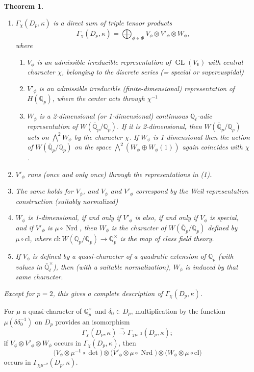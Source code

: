 \documentclass[11pt,a4paper]{article}
\theoremstyle{plain}
\newtheorem{theorem}{Theorem}[section]
\theoremstyle{definition}
\theoremstyle{remark}
\DeclareMathOperator{\GL}{GL}
\DeclareMathOperator{\Nrd}{Nrd}
\newcommand{\Qpbar}{\overline{\mathbb{Q}}_{p}}
\newcommand{\Qp}{\mathbb{Q}_{p}}
\newcommand{\Qlbar}{\overline{\mathbb{Q}}_{\ell}}
\begin{document}
\begin{theorem}
\begin{enumerate}[label=(\roman*)]
\item $\Gamma_{\chi}(D_{p}, \kappa)$ is a direct sum of triple tensor products
\[
\Gamma_{\chi}(D_{p}, \kappa) = \bigoplus_{\phi \in \Phi} V_{\phi} \otimes V'_{\phi} \otimes W_{\phi},
\]
where
\begin{enumerate}[label=(\alph*)]
\item $V_{\phi}$ is an admissible irreducible representation of $\GL(V_{0})$ with central character $\chi$, belonging to the discrete series (= special or supercuspidal)
\item $V'_{\phi}$ is an admissible irreducible (finite-dimensional) representation of $H(\Qp)$, where the center acts through $\chi^{-1}$
\item $W_{\phi}$ is a 2-dimensional (or 1-dimensional) continuous $\Qlbar$-adic representation of $W(\Qpbar/\Qp)$. If it is 2-dimensional, then $W(\Qpbar/\Qp)$ acts on $\bigwedge^{2} W_{\phi}$ by the character $\chi$. If $W_{\phi}$ is 1-dimensional then the action of $W(\Qpbar/\Qp)$ on the space $\bigwedge^{2}(W_{\phi} \oplus W_{\phi}(1))$ again coincides with $\chi$.
\end{enumerate}
\item $V'_{\phi}$ runs (once and only once) through the representations in (1).
\item The same holds for $V_{\phi}$, and $V_{\phi}$ and $V'_{\phi}$ correspond by the Weil representation construction (suitably normalized)
\item $W_{\phi}$ is 1-dimensional, if and only if $V'_{\phi}$ is also, if and only if $V_{\phi}$ is special, and if $V'_{\phi}$ is $\mu \circ \Nrd$, then $W_{\phi}$ is the character of $W(\Qpbar/\Qp)$ defined by $\mu \circ \mathrm{cl}$, where $\mathrm{cl} : W(\Qpbar/\Qp) \to \Qp^{\times}$ is the map of class field theory.
\item If $V_{\phi}$ is defined by a quasi-character of a quadratic extension of $\Qp$ (with values in $\Qlbar^{\times}$), then (with a suitable normalization), $W_{\phi}$ is induced by that same character.
\end{enumerate}
Except for $p = 2$, this gives a complete description of $\Gamma_{\chi}(D_{p}, \kappa)$.
\end{theorem}

For $\mu$ a quasi-character of $\Qp^{\times}$ and $\delta_{0} \in D_{p}$, multiplication by the function $\mu(\delta\delta_{0}^{-1})$ on $D_{p}$ provides an isomorphism
\[
\Gamma_{\chi}(D_{p}, \kappa) \xrightarrow{\sim} \Gamma_{\chi\mu^{-2}}(D_{p}, \kappa);
\]
if $V_{\phi} \otimes V'_{\phi} \otimes W_{\phi}$ occurs in $\Gamma_{\chi}(D_{p}, \kappa)$, then
\[
\bigl(V_{\phi} \otimes \mu^{-1} \circ \det\bigr) \otimes \bigl(V'_{\phi} \otimes \mu \circ \Nrd\bigr) \otimes \bigl(W_{\phi} \otimes \mu \circ \mathrm{cl}\bigr)
\]
occurs in $\Gamma_{\chi\mu^{-2}}(D_{p}, \kappa)$.
\end{document}
